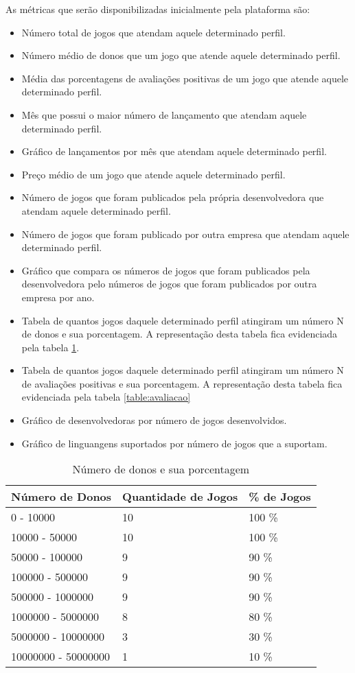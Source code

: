 As métricas que serão disponibilizadas inicialmente pela plataforma são:
\begin{itemize}
	\item Número total de jogos que atendam aquele determinado perfil.
	\item Número médio de donos que um jogo que atende aquele determinado perfil.
	\item Média das porcentagens de avaliações positivas de um jogo que atende aquele determinado perfil.
	\item Mês que possui o maior número de lançamento que atendam aquele determinado perfil.
	\item Gráfico de lançamentos por mês que atendam aquele determinado perfil.
	\item Preço médio de um jogo que atende aquele determinado perfil.
	\item Número de jogos que foram publicados pela própria desenvolvedora que atendam aquele determinado perfil.
	\item Número de jogos que foram publicado por outra empresa que atendam aquele determinado perfil.
	\item Gráfico que compara os números de jogos que foram publicados pela desenvolvedora pelo números de jogos que foram publicados por outra empresa por ano.
	\item Tabela de quantos jogos daquele determinado perfil atingiram um número N de donos e sua porcentagem. A representação desta tabela fica evidenciada pela tabela \ref{table:num_donos}.
	\item Tabela de quantos jogos daquele determinado perfil atingiram um número N de avaliações positivas e sua porcentagem. A representação desta tabela fica evidenciada pela tabela \ref{table:avaliacao}
	\item Gráfico de desenvolvedoras por número de jogos desenvolvidos.
	\item Gráfico de linguangens suportados por número de jogos que a suportam.
\end{itemize}
\begin{table}
\centering
\begin{tabular}{|p{5cm}|p{5cm}|p{5cm}|}
\hline \textbf{Número de Donos} & \textbf{Quantidade de Jogos} & \textbf{\% de Jogos} \\
\hline 0 - 10000 & 10 & 100 \% \\
\hline 10000 - 50000 & 10 & 100 \% \\
\hline 50000 - 100000 & 9 & 90 \% \\
\hline 100000 - 500000 & 9 & 90 \% \\
\hline 500000 - 1000000 & 9 & 90 \% \\
\hline 1000000 - 5000000 & 8 & 80 \% \\
\hline 5000000 - 10000000 & 3 & 30 \% \\
\hline 10000000 - 50000000 & 1 & 10 \% \\
\hline
\end{tabular}
\caption{Número de donos e sua porcentagem}
\label{table:num_donos}
\end{table}
